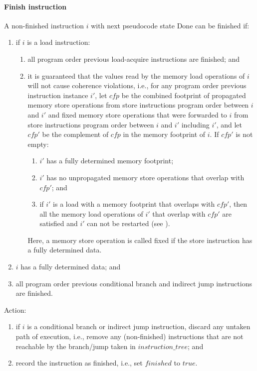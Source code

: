\paragraph{Finish instruction}\label{omm:thread:finish}
A non-finished instruction $i$ with next pseudocode state {\sc Done} can be finished if:
\begin{enumerate}
\item if $i$ is a load instruction:
  \begin{enumerate}
  \item all program order previous load-acquire instructions are finished; and
  \item it is guaranteed that the values read by the memory load operations of $i$ will not cause coherence violations, i.e., for any program order previous instruction instance $i'$, let $cfp$ be the combined footprint of propagated memory store operations from store instructions program order between $i$ and $i'$ and fixed memory store operations that were forwarded to $i$ from store instructions program order between $i$ and $i'$ including $i'$, and let $cfp'$ be the complement of $cfp$ in the memory footprint of $i$.
  If $cfp'$ is not empty:
    \begin{enumerate}
    \item $i'$ has a fully determined memory footprint;
    \item $i'$ has no unpropagated memory store operations that overlap with $cfp'$; and
    \item if $i'$ is a load with a memory footprint that overlaps with $cfp'$, then all the memory load operations of $i'$ that overlap with $cfp'$ are satisfied and $i'$ can not be restarted (see ).
    \end{enumerate}
  Here, a memory store operation is called fixed if the store instruction has a fully determined data.
  \end{enumerate}
\item $i$ has a fully determined data; and
\item all program order previous conditional branch and indirect jump instructions are finished.
\end{enumerate}
Action:
\begin{enumerate}
\item if $i$ is a conditional branch or indirect jump instruction, discard any untaken path of execution, i.e., remove any (non-finished) instructions that are not reachable by the branch/jump taken in $instruction\_tree$; and
\item record the instruction as finished, i.e., set $finished$ to $true$.
\end{enumerate}


